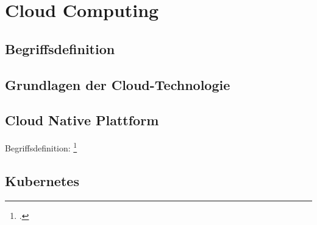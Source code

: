 \newpage
\section{Cloud Computing}\label{lab:cloud}
\subsection{Begriffsdefinition}
\subsection{Grundlagen der Cloud-Technologie}
\subsection{Cloud Native Plattform}
Begriffsdefinition: \footcite[Vgl.][S. 33-34]{kratzke2021cloud}
\subsection{Kubernetes}

